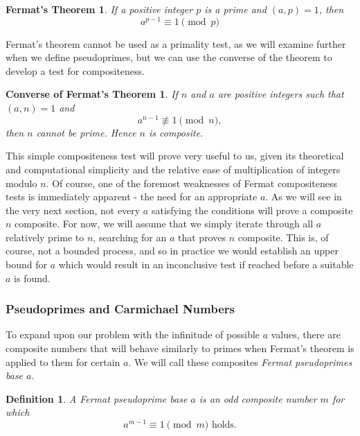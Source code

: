 \documentclass{article}
\newtheorem*{definition}{Definition}
\begin{document}
\newtheorem*{fermattheorem}{Fermat's Theorem}
\begin{fermattheorem}
If a positive integer $p$ is a prime and $(a,p) = 1$, then
	$$a^{p-1} \equiv 1 \pmod p$$
\end{fermattheorem}

\par Fermat's theorem cannot be used as a primality test, as we will examine further when we define pseudoprimes, but we can use the converse of the theorem to develop a test for compositeness.

\newtheorem*{fermatconverse}{Converse of Fermat's Theorem}
\begin{fermatconverse}
If $n$ and $a$ are positive integers such that $(a,n) = 1$ and
	$$a^{n-1} \not\equiv 1 \pmod n,$$
	then $n$ cannot be prime. Hence $n$ is composite.
\end{fermatconverse}

\par This simple compositeness test will prove very useful to us, given its theoretical and computational simplicity and the relative ease of multiplication
of integers modulo $n$. Of course, one of the foremost weaknesses of Fermat compositeness tests is immediately apparent - the need for an appropriate $a$. As we will see in the very next section, not every $a$ satisfying the conditions will prove a composite $n$ composite. For now, we will assume that we simply iterate through all $a$ relatively prime to $n$, searching for an $a$ that proves $n$ composite. This is, of course, not a bounded process, and so in practice we would establish an upper bound for $a$ which would result in an inconclusive test if reached before a suitable $a$ is found. 

\subsubsection*{ Pseudoprimes and Carmichael Numbers }
To expand upon our problem with the infinitude of possible $a$ values, there are composite numbers that will behave similarly to primes when Fermat's theorem is applied to them for certain $a$. We will call these composites \textit{Fermat pseudoprimes base $a$}.
\begin{definition}
A \textit{ Fermat pseudoprime} base $a$ is an odd composite number $m$ for which 
$$ a^{m-1} \equiv 1 \pmod m \text{ holds.}$$  
\end{definition}
\end{document}
